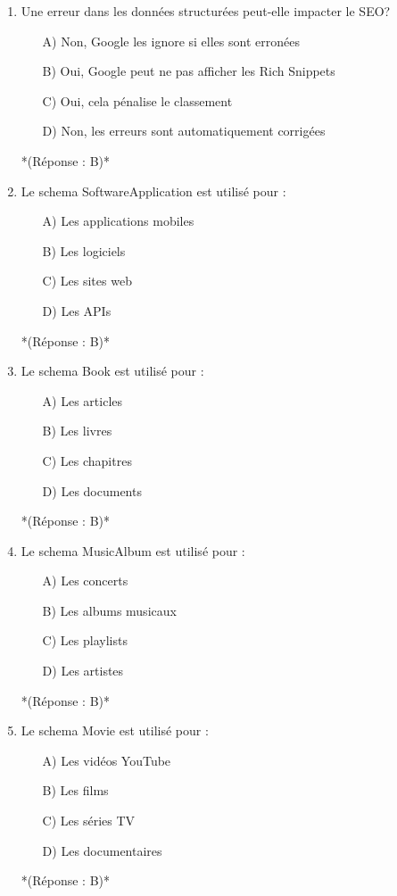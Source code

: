\documentclass[12pt,a4paper,twoside]{report}
\begin{document}
\begin{enumerate}
\item Une erreur dans les données structurées peut-elle impacter le SEO?
\begin{itemize}
\item[A)] Non, Google les ignore si elles sont erronées
\item[B)] Oui, Google peut ne pas afficher les Rich Snippets
\item[C)] Oui, cela pénalise le classement
\item[D)] Non, les erreurs sont automatiquement corrigées
\end{itemize}
*(Réponse : B)*

\item Le schema SoftwareApplication est utilisé pour :
\begin{itemize}
\item[A)] Les applications mobiles
\item[B)] Les logiciels
\item[C)] Les sites web
\item[D)] Les APIs
\end{itemize}
*(Réponse : B)*

\item Le schema Book est utilisé pour :
\begin{itemize}
\item[A)] Les articles
\item[B)] Les livres
\item[C)] Les chapitres
\item[D)] Les documents
\end{itemize}
*(Réponse : B)*

\item Le schema MusicAlbum est utilisé pour :
\begin{itemize}
\item[A)] Les concerts
\item[B)] Les albums musicaux
\item[C)] Les playlists
\item[D)] Les artistes
\end{itemize}
*(Réponse : B)*

\item Le schema Movie est utilisé pour :
\begin{itemize}
\item[A)] Les vidéos YouTube
\item[B)] Les films
\item[C)] Les séries TV
\item[D)] Les documentaires
\end{itemize}
*(Réponse : B)*


\end{enumerate}
\end{document}
